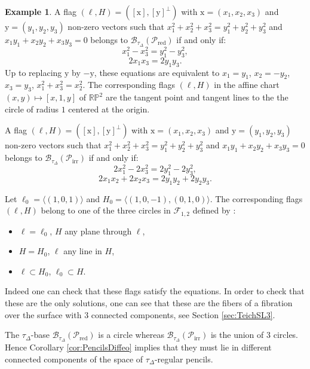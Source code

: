 \documentclass[reqno,10pt]{amsart}
\theoremstyle{plain}
\theoremstyle{definition}
\newtheorem{exmp}[thm]{Example}
\theoremstyle{remark}
\newcommand{\type}{\tau}
\begin{document}
\begin{exmp}
\smallskip

A flag $(\ell,H)=([\mathrm{x}],[\mathrm{y}]^\perp)$ with $\mathrm{x}=(x_1,x_2,x_3)$ and $\mathrm{y}=(y_1,y_2,y_3)$ non-zero vectors such that $x_1^2+x_2^2+x_3^2=y_1^2+y_2^2+y_3^2$ and $x_1y_1+x_2y_2+x_3y_3=0$ belongs to $\mathcal{B}_{\type_\Delta}(\mathcal{P}_\text{red})$ if and only if:
$$x_1^2-x_3^2=y_1^2-y_3^2,$$
$$2x_1x_3=2y_1y_3.$$
Up to replacing $\mathrm{y}$ by $-\mathrm{y}$, these equations are equivalent to $x_1=y_1$, $x_2=-y_2$, $x_3=y_3$, $x_1^2+x_3^2=x_2^2$.
The corresponding flags $(\ell,H)$ in the affine chart $(x,y) \mapsto [x,1,y]$ of $\mathbb{RP}^2$ are the tangent point and tangent lines to the the circle of radius $1$ centered at the origin.

\smallskip

A flag $(\ell,H)=([\mathrm{x}],[\mathrm{y}]^\perp)$ with $\mathrm{x}=(x_1,x_2,x_3)$ and $\mathrm{y}=(y_1,y_2,y_3)$ non-zero vectors such that $x_1^2+x_2^2+x_3^2=y_1^2+y_2^2+y_3^2$ and $x_1y_1+x_2y_2+x_3y_3=0$ belongs to $\mathcal{B}_{\type_\Delta}(\mathcal{P}_\text{irr})$ if and only if:
$$2x_1^2-2x_3^2=2y_1^2-2y_3^2,$$
$$2x_1x_2+2x_2x_3=2y_1y_2+2y_2y_3.$$

Let $\ell_0=\langle(1,0,1)\rangle$ and $H_0=\langle(1,0,-1), (0,1,0) \rangle$. The corresponding flags $(\ell,H)$ belong to one of the three circles in $\mathcal{F}_{1,2}$ defined by :

\begin{itemize}
\item[-] $\ell=\ell_0$, $H$ any plane through $\ell$,
\item[-] $H=H_0$, $\ell $ any line in $H$,
\item[-] $\ell\subset H_0$, $\ell_0\subset H$.
\end{itemize}

Indeed one can check that these flags satisfy the equations. In order to check that these are the only solutions, one can see that these are the fibers of a fibration over the surface with $3$ connected components, see Section \ref{sec:TeichSL3}.


\smallskip

The $\type_\Delta$-base $\mathcal{B}_{\type_\Delta}(\mathcal{P}_\text{red})$ is a circle whereas $\mathcal{B}_{\type_\Delta}(\mathcal{P}_\text{irr})$ is the union of $3$ circles. Hence Corollary \ref{cor:PencilsDiffeo} implies that they must lie in different connected components of the space of $\type_\Delta$-regular pencils.
\end{exmp}
\end{document}
